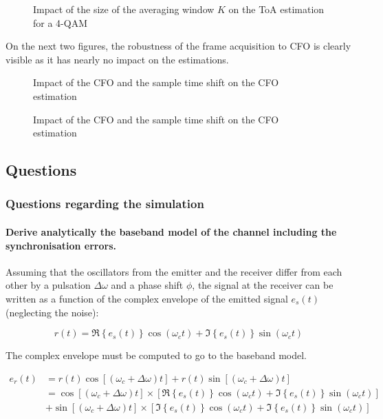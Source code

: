 \begin{figure}[H]
    \centering
    
    \caption{Impact of the size of the averaging window $K$ on the ToA estimation for a 4-QAM}
\end{figure}


On the next two figures, the robustness of the frame acquisition to CFO is clearly visible as it has nearly no impact on the estimations.

\begin{figure}[H]
    \centering
    
    \caption{Impact of the CFO and the sample time shift on the CFO estimation}
\end{figure}

\begin{figure}[H]
    \centering
    
    \caption{Impact of the CFO and the sample time shift on the CFO estimation}
\end{figure}



\subsection{Questions}

\subsubsection{Questions regarding the simulation}

\paragraph{Derive analytically the baseband model of the channel including the synchronisation errors.} \mbox{}

Assuming that the oscillators from the emitter and the receiver differ from each other by a pulsation $\Delta \omega$ and a phase shift $\phi$, the signal at the receiver can be written as a function of the complex envelope of the emitted signal $e_s(t)$ (neglecting the noise):

\begin{equation*}
    r(t) = \Re \left\{ e_s(t) \right\} \cos ( \omega_c t ) + \Im \left\{ e_s(t) \right\} \sin ( \omega_c t )
\end{equation*}

The complex envelope must be computed to go to the baseband model.

\begin{equation*}
    \begin{split}
    e_r(t) & = r(t) \cos \left[ (\omega_c + \Delta \omega) t \right] + r(t) \sin \left[ (\omega_c + \Delta \omega) t \right] \\
    & =  \cos \left[ (\omega_c + \Delta \omega) t \right] \times \left[\Re \left\{ e_s(t) \right\} \cos ( \omega_c t ) + \Im \left\{ e_s(t) \right\} \sin ( \omega_c t ) \right]\\
    & +  \sin \left[ (\omega_c + \Delta \omega) t \right] \times \left[\Im \left\{ e_s(t) \right\} \cos ( \omega_c t ) + \Im \left\{ e_s(t) \right\} \sin ( \omega_c t ) \right]
    \end{split}
\end{equation*}

